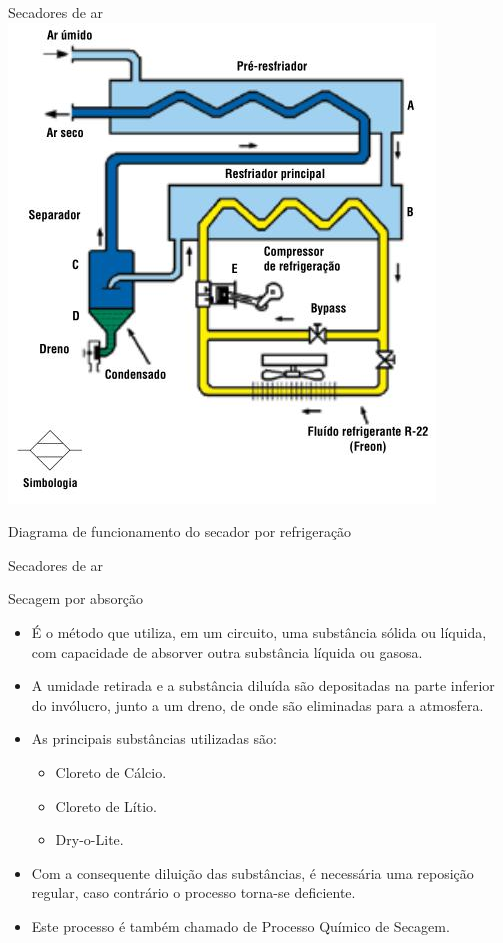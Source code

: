\begin{frame}{Secadores de ar}
	\centering
	\includegraphics[height=0.8\textheight]{Figuras/Ch13/fig6}
	
	Diagrama de funcionamento do secador por refrigeração
\end{frame}


\begin{frame}{Secadores de ar}
	\begin{block}{Secagem por absorção}
		\begin{itemize}
			\item É o método que utiliza, em um circuito, uma substância sólida ou líquida, com capacidade de absorver outra substância líquida ou gasosa.
			
			\item A umidade retirada e a substância diluída são depositadas na parte inferior do invólucro, junto a um dreno, de onde são	eliminadas para a atmosfera.
			
			\item As principais substâncias utilizadas são:
			\begin{itemize}
				\item Cloreto de Cálcio.
				\item Cloreto de Lítio.
				\item Dry-o-Lite.
			\end{itemize}
			
			\item Com a consequente diluição das substâncias, é necessária uma reposição regular, caso contrário o processo torna-se deficiente.
			
			\item Este processo é também chamado de Processo Químico de Secagem.
		\end{itemize}
	\end{block}
\end{frame}


